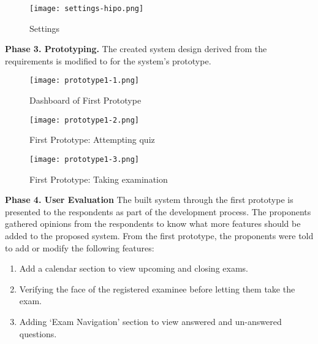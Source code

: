 \vspace{1cm}

\begin{figure}[h!]
   \begin{center}
      \texttt{[image: settings-hipo.png]}
      \caption{Settings}
   \end{center}
\end{figure}

\textbf{Phase 3. Prototyping.}
The created system design derived from the requirements is modified to for the system’s prototype.

\pagebreak

\begin{figure}[h!]
   \begin{center}
      \texttt{[image: prototype1-1.png]}
      \caption{Dashboard of First Prototype}
   \end{center}
\end{figure}

\begin{figure}[h!]
   \begin{center}
      \texttt{[image: prototype1-2.png]}
      \caption{First Prototype: Attempting quiz}
   \end{center}
\end{figure}

\pagebreak

\begin{figure}[h!]
   \begin{center}
      \texttt{[image: prototype1-3.png]}
      \caption{First Prototype: Taking examination}
   \end{center}
\end{figure}

\textbf{Phase 4. User Evaluation}
The built system through the first prototype is presented to the respondents as part of the development process.
The proponents gathered opinions from the respondents to know what more features should be added to the proposed system.
From the first prototype, the proponents were told to add or modify the following features:

\begin{enumerate}
   \item Add a calendar section to view upcoming and closing exams.
   \item Verifying the face of the registered examinee before letting them take the exam.
   \item Adding ‘Exam Navigation’ section to view answered and un-answered questions.
\end{enumerate}

